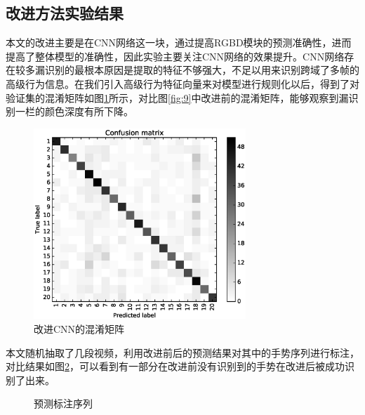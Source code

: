 \documentclass[a4paper, 12pt]{article}
\begin{document}
\subsection{改进方法实验结果}
本文的改进主要是在CNN网络这一块，通过提高RGBD模块的预测准确性，进而提高了整体模型的准确性，因此实验主要关注CNN网络的效果提升。CNN网络存在较多漏识别的最根本原因是提取的特征不够强大，不足以用来识别跨域了多帧的高级行为信息。在我们引入高级行为特征向量来对模型进行规则化以后，得到了对验证集的混淆矩阵如图\ref{fig:10}所示，对比图\ref{fig:9}中改进前的混淆矩阵，能够观察到漏识别一栏的颜色深度有所下降。
\begin{figure}[ht]
  \centering
  \includegraphics[width=8cm]{cmnorm.eps}
  \caption{\label{fig:10}改进CNN的混淆矩阵}
\end{figure}

本文随机抽取了几段视频，利用改进前后的预测结果对其中的手势序列进行标注，对比结果如图\ref{fig:11}，可以看到有一部分在改进前没有识别到的手势在改进后被成功识别了出来。
\begin{figure} \centering
{}
\caption{\label{fig:11}预测标注序列}
\end{figure}
\end{document}
